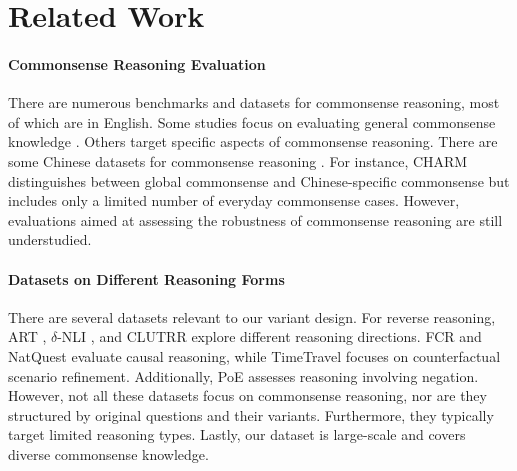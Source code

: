\section{Related Work}

\paragraph{Commonsense Reasoning Evaluation} 
There are numerous benchmarks and datasets for commonsense reasoning, most of which are in English. 
Some studies focus on evaluating general commonsense knowledge \cite{zellers2019hellaswag,talmor2019commonsenseqa,OpenBookQA2018}. 
Others target specific aspects of commonsense reasoning\cite{zhou2019going,bisk2020piqa,sap2019socialiqa,lin2020birds,clark2018think,khot2020qasc}.
There are some Chinese datasets for commonsense reasoning \cite{sun2024benchmarking,shi2024corecode}. 
For instance, CHARM \cite{sun2024benchmarking} distinguishes between global commonsense and Chinese-specific commonsense but includes only a limited number of everyday commonsense cases. 
However, evaluations aimed at assessing the robustness of commonsense reasoning are still understudied. 

\paragraph{Datasets on Different Reasoning Forms}
There are several datasets relevant to our variant design. For reverse reasoning, ART \cite{DBLP:conf/iclr/BhagavatulaBMSH20}, $\delta$-NLI \cite{DBLP:conf/emnlp/RudingerSHBFBSC20}, and CLUTRR \cite{DBLP:conf/emnlp/SinhaSDPH19} explore different reasoning directions. FCR \cite{DBLP:journals/corr/abs-2204-07408} and NatQuest \cite{ceraolo2024analyzinghumanquestioningbehavior} evaluate causal reasoning, while TimeTravel \cite{DBLP:conf/emnlp/QinBHBCC19} focuses on counterfactual scenario refinement. Additionally, PoE \cite{balepur2024s} assesses reasoning involving negation. 
However, not all these datasets focus on commonsense reasoning, nor are they structured by original questions and their variants. Furthermore, they typically target limited reasoning types. Lastly, our dataset is large-scale and covers diverse commonsense knowledge. 

